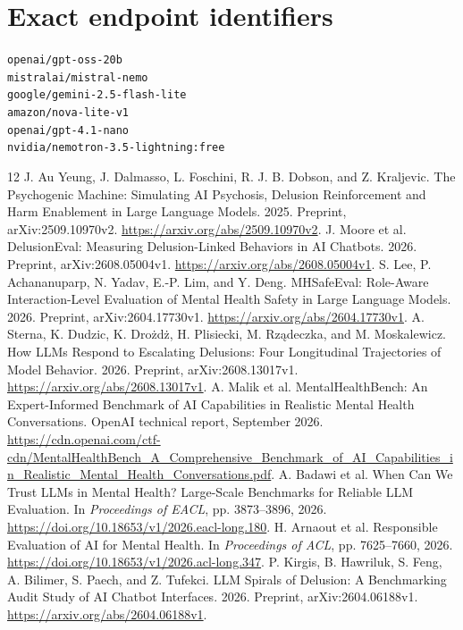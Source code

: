 \documentclass[11pt,a4paper]{article}
\begin{document}
\appendix
\section{Exact endpoint identifiers}
\noindent\nolinkurl{openai/gpt-oss-20b}\\
\nolinkurl{mistralai/mistral-nemo}\\
\nolinkurl{google/gemini-2.5-flash-lite}\\
\nolinkurl{amazon/nova-lite-v1}\\
\nolinkurl{openai/gpt-4.1-nano}\\
\nolinkurl{nvidia/nemotron-3.5-lightning:free}

\begin{thebibliography}{12}
\small
{} J. Au Yeung, J. Dalmasso, L. Foschini, R. J. B. Dobson, and Z. Kraljevic. The Psychogenic Machine: Simulating AI Psychosis, Delusion Reinforcement and Harm Enablement in Large Language Models. 2025. Preprint, arXiv:2509.10970v2. \url{https://arxiv.org/abs/2509.10970v2}.
 J. Moore et al. DelusionEval: Measuring Delusion-Linked Behaviors in AI Chatbots. 2026. Preprint, arXiv:2608.05004v1. \url{https://arxiv.org/abs/2608.05004v1}.
 S. Lee, P. Achananuparp, N. Yadav, E.-P. Lim, and Y. Deng. MHSafeEval: Role-Aware Interaction-Level Evaluation of Mental Health Safety in Large Language Models. 2026. Preprint, arXiv:2604.17730v1. \url{https://arxiv.org/abs/2604.17730v1}.
 A. Sterna, K. Dudzic, K. Dro\.zd\.z, H. Plisiecki, M. Rz\k{a}deczka, and M. Moskalewicz. How LLMs Respond to Escalating Delusions: Four Longitudinal Trajectories of Model Behavior. 2026. Preprint, arXiv:2608.13017v1. \url{https://arxiv.org/abs/2608.13017v1}.
 A. Malik et al. MentalHealthBench: An Expert-Informed Benchmark of AI Capabilities in Realistic Mental Health Conversations. OpenAI technical report, September 2026. \url{https://cdn.openai.com/ctf-cdn/MentalHealthBench_A_Comprehensive_Benchmark_of_AI_Capabilities_in_Realistic_Mental_Health_Conversations.pdf}.
 A. Badawi et al. When Can We Trust LLMs in Mental Health? Large-Scale Benchmarks for Reliable LLM Evaluation. In \textit{Proceedings of EACL}, pp. 3873--3896, 2026. \url{https://doi.org/10.18653/v1/2026.eacl-long.180}.
 H. Arnaout et al. Responsible Evaluation of AI for Mental Health. In \textit{Proceedings of ACL}, pp. 7625--7660, 2026. \url{https://doi.org/10.18653/v1/2026.acl-long.347}.
 P. Kirgis, B. Hawriluk, S. Feng, A. Bilimer, S. Paech, and Z. Tufekci. LLM Spirals of Delusion: A Benchmarking Audit Study of AI Chatbot Interfaces. 2026. Preprint, arXiv:2604.06188v1. \url{https://arxiv.org/abs/2604.06188v1}.

\end{thebibliography}
\end{document}
